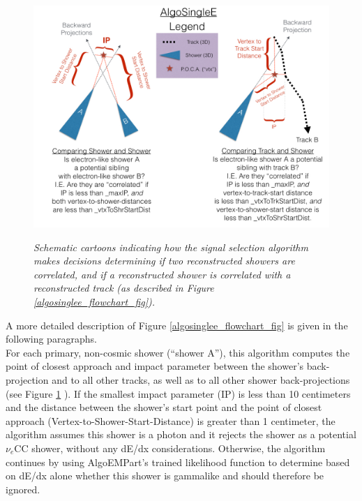 \begin{figure}[ht!]
\centering
\includegraphics[width=150mm]{Figures/algosinglee_cartoon.png}\\
\caption{\textit{Schematic cartoons indicating how the signal selection algorithm makes decisions determining if two reconstructed showers are correlated, and if a reconstructed shower is correlated with a reconstructed track (as described in Figure \ref{algosinglee_flowchart_fig}).}}
\label{algosinglee_cartoon_fig}
\end{figure}

A more detailed description of Figure \ref{algosinglee_flowchart_fig} is given in the following paragraphs.\\

For each primary, non-cosmic shower (``shower A''), this algorithm computes the point of closest approach and impact parameter between the shower's back-projection and to all other tracks, as well as to all other shower back-projections (see Figure \ref{algosinglee_cartoon_fig} ). If the smallest impact parameter (IP) is less than 10 centimeters and the distance between the shower's start point and the point of closest approach (Vertex-to-Shower-Start-Distance) is greater than 1 centimeter, the algorithm assumes this shower is a photon and it rejects the shower as a potential $\nu_e$CC shower, without any dE/dx considerations. Otherwise, the algorithm continues by using AlgoEMPart's trained likelihood function to determine based on dE/dx alone whether this shower is gammalike and should therefore be ignored.\\

